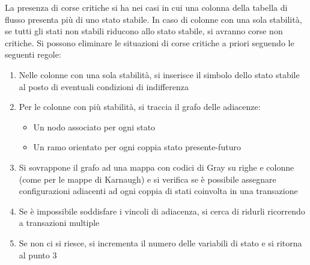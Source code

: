 \documentclass{article}
\begin{document}
La presenza di corse critiche si ha nei casi in cui una colonna della tabella di flusso presenta più di uno stato stabile.
In caso di colonne con una sola stabilità, se tutti gli stati non stabili riducono allo stato stabile, si avranno corse non critiche.
Si possono eliminare le situazioni di corse critiche a priori seguendo le seguenti regole:

\begin{enumerate}
    \item Nelle colonne con una sola stabilità, si inserisce il simbolo dello stato stabile al posto di eventuali condizioni di indifferenza
    \item Per le colonne con più stabilità, si traccia il grafo delle adiacenze:

    \begin{itemize}
        \item Un nodo associato per ogni stato
        \item Un ramo orientato per ogni coppia stato presente-futuro
    \end{itemize}

    \item Si sovrappone il grafo ad una mappa con codici di Gray su righe e colonne (come per le mappe di Karnaugh) e si verifica se è possibile assegnare configurazioni adiacenti ad ogni coppia di stati coinvolta in una transazione
    \item Se è impossibile soddisfare i vincoli di adiacenza, si cerca di ridurli ricorrendo a transazioni multiple
    \item Se non ci si riesce, si incrementa il numero delle variabili di stato e si ritorna al punto 3
\end{enumerate}
\end{document}

